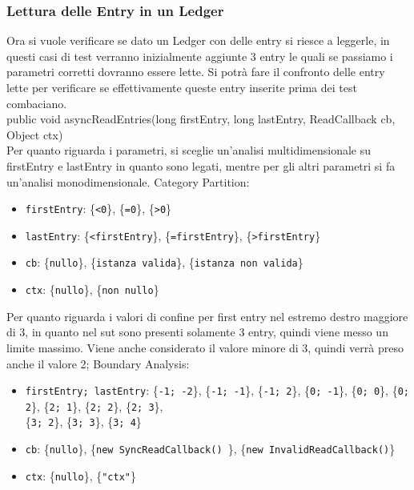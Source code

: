 \documentclass[10pt]{article}
\begin{document}
{		\subsubsection{Lettura delle Entry in un Ledger}
		Ora si vuole verificare se dato un Ledger con delle entry si riesce a leggerle, in questi casi di test verranno inizialmente aggiunte 3 entry le quali se passiamo i parametri corretti dovranno essere lette. Si potrà fare il confronto delle entry lette per verificare se effettivamente queste entry inserite prima dei test combaciano.\\
		public void asyncReadEntries(long firstEntry, long lastEntry, ReadCallback cb, Object ctx)\\
		Per quanto riguarda i parametri, si sceglie un'analisi multidimensionale su firstEntry e lastEntry in quanto sono legati, mentre per gli altri parametri si fa un'analisi monodimensionale. 
		Category Partition:
		\begin{itemize}[label=--, itemsep=2pt, parsep=0pt]
			\item \texttt{firstEntry}: \{\texttt{<0}\}, \{\texttt{=0}\}, \{\texttt{>0}\}
			\item \texttt{lastEntry}: \{\texttt{<firstEntry}\}, \{\texttt{=firstEntry}\}, \{\texttt{>firstEntry}\}
			\item \texttt{cb}: \{\texttt{nullo}\}, \{\texttt{istanza valida}\}, \{\texttt{istanza non valida}\}
			\item \texttt{ctx}: \{\texttt{nullo}\}, \{\texttt{non nullo}\}
		\end{itemize}
		Per quanto riguarda i valori di confine per first entry nel estremo destro maggiore di 3, in quanto nel sut sono presenti solamente 3 entry, quindi viene messo un limite massimo. Viene anche considerato il valore minore di 3, quindi verrà preso anche il valore 2;
		Boundary Analysis:
		\begin{itemize}[label=--, itemsep=2pt, parsep=0pt]
			\item \texttt{firstEntry; lastEntry}: \{\texttt{-1; -2}\}, \{\texttt{-1; -1}\}, \{\texttt{-1; 2}\}, \{\texttt{0; -1}\},  \{\texttt{0; 0}\}, \{\texttt{0; 2}\}, \{\texttt{2; 1}\}, \{\texttt{2; 2}\}, \{\texttt{2; 3}\}, 
			\\    \{\texttt{3; 2}\}, \{\texttt{3; 3}\}, \{\texttt{3; 4}\}
			\item \texttt{cb}: \{\texttt{nullo}\}, \{\texttt{new SyncReadCallback() }\}, \{\texttt{new InvalidReadCallback()}\}
			\item \texttt{ctx}: \{\texttt{nullo}\}, \{\texttt{"ctx"}\}
		\end{itemize}
		
}
\end{document}
